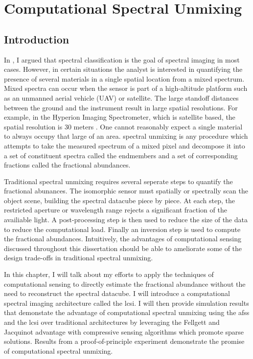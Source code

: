 \chapter{Computational Spectral Unmixing}\label{chap:Csu}

\section{Introduction}

In , I argued that spectral classification is the goal of spectral imaging in most cases. However, in certain situations the analyst is interested in quantifying the presence of several materials in a single spatial location from a \gls{mixed spectrum}. Mixed spectra can occur when the sensor is part of a high-altitude platform such as an unmanned aerial vehicle (UAV) or satellite. The large standoff distances between the ground and the instrument result in large spatial resolutions. For example, in the Hyperion Imaging Spectrometer, which is satellite based, the spatial resolution is 30 meters \cite{folkman2001eo}. One cannot reasonably expect a single material to always occupy that large of an area. \Gls{spectral unmixing} is any procedure which attempts to take the measured spectrum of a mixed pixel and decompose it into a set of constituent spectra called the \glspl{endmember} and a set of corresponding fractions called the \glspl{fractional abundance}. 

Traditional spectral unmixing requires several seperate steps to quantify the fractional abunances. The isomorphic sensor must spatially or spectrally scan the object scene, building the spectral datacube piece by piece. At each step, the restricted aperture or wavelength range rejects a significant fraction of the availiable light. A post-processing step is then used to reduce the size of the data to reduce the computational load. Finally an inversion step is used to compute the fractional abundances. Intuitively, the advantages of computational sensing discussed throughout this dissertation should be able to ameliorate some of the design trade-offs in traditional spectral unmixing.

In this chapter, I will talk about my efforts to apply the techniques of computational sensing to directly estimate the \gls{fractional abundance} without the need to reconstruct the spectral datacube. I will introduce a computational spectral imaging architecture called the \gls{lcsi}. I will then provide simulation results that demonstate the advantage of computational spectral unmixing using the \gls{afss} and the \gls{lcsi} over traditional architectures by leveraging the Fellgett and Jacquinot advantage with compressive sensing algorithms which promote sparse solutions. Results from a proof-of-principle experiment demonstrate the promise of computational spectral unmixing. 

